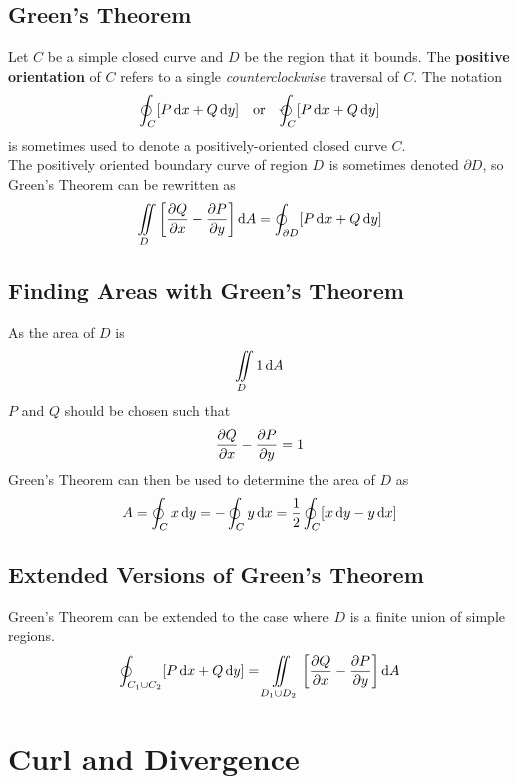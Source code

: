 \documentclass[./Calculus \Roman{3}.tex]{subfiles}
\begin{document}
		\subsection*{Green's Theorem}
			Let $C$ be a simple closed curve and $D$ be the region that it bounds. The \textbf{positive orientation} of $C$ refers to a single \textit{counterclockwise} traversal of $C$.
			The notation
				\begin{align*}
					\oint_C[P\,\d x + Q\,\d y] &&\text{or}&& \varointctrclockwise_C[P\,\d x + Q\,\d y]
				\end{align*}
				is sometimes used to denote a positively-oriented closed curve $C$. \\
			The positively oriented boundary curve of region $D$ is sometimes denoted $\partial D$, so Green's Theorem can be rewritten as
				\[\iint\limits_D \left[\frac{\partial Q}{\partial x} - \frac{\partial P}{\partial y}\right]\mathrm{d} A = \oint_{\partial D}[P\,\mathrm{d} x + Q\,\mathrm{d} y]\]
		\subsection*{Finding Areas with Green's Theorem}
			As the area of $D$ is 
				\[\iint\limits_D 1\,\mathrm{d} A\]
				$P$ and $Q$ should be chosen such that
				\[\frac{\partial Q}{\partial x} - \frac{\partial P}{\partial y} = 1\]
				Green's Theorem can then be used to determine the area of $D$ as
				\[A = \oint_C x\,\mathrm{d} y = -\oint_C y\,\mathrm{d} x = \frac{1}{2}\oint_C[x\,\mathrm{d} y - y\,\mathrm{d} x]\]
		\subsection*{Extended Versions of Green's Theorem}
			Green's Theorem can be extended to the case where $D$ is a finite union of simple regions.
			\[\oint_{C_1 \cup C_2}[P\,\mathrm{d} x + Q\,\mathrm{d} y] = \iint\limits_{D_1 \cup D_2}\left[\frac{\partial Q}{\partial x} - \frac{\partial P}{\partial y}\right]\mathrm{d} A\]
	\section{Curl and Divergence}
\end{document}
